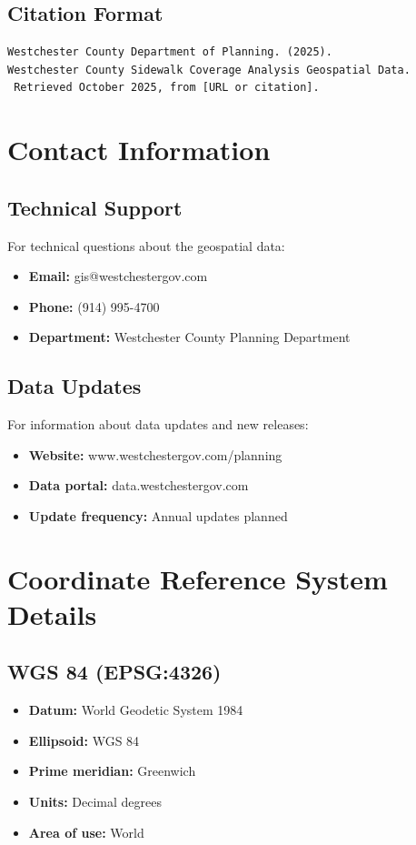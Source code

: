 \documentclass[11pt,letterpaper]{article}
\begin{document}
\subsection{Citation Format}

\begin{verbatim}
Westchester County Department of Planning. (2025).
Westchester County Sidewalk Coverage Analysis Geospatial Data.
 Retrieved October 2025, from [URL or citation].
\end{verbatim}

\section{Contact Information}

\subsection{Technical Support}

For technical questions about the geospatial data:
\begin{itemize}
    \item \textbf{Email:} gis@westchestergov.com
    \item \textbf{Phone:} (914) 995-4700
    \item \textbf{Department:} Westchester County Planning Department
\end{itemize}

\subsection{Data Updates}

For information about data updates and new releases:
\begin{itemize}
    \item \textbf{Website:} www.westchestergov.com/planning
    \item \textbf{Data portal:} data.westchestergov.com
    \item \textbf{Update frequency:} Annual updates planned
\end{itemize}

\appendix

\section{Coordinate Reference System Details}

\subsection{WGS 84 (EPSG:4326)}
\begin{itemize}
    \item \textbf{Datum:} World Geodetic System 1984
    \item \textbf{Ellipsoid:} WGS 84
    \item \textbf{Prime meridian:} Greenwich
    \item \textbf{Units:} Decimal degrees
    \item \textbf{Area of use:} World
\end{itemize}
\end{document}
